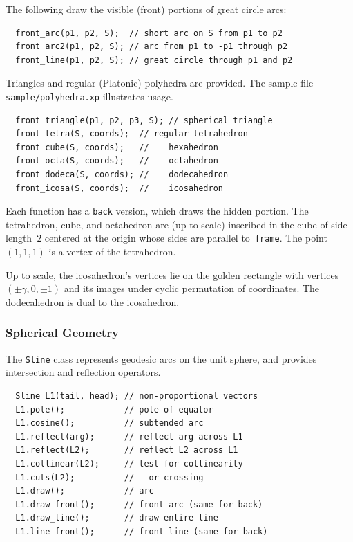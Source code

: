 \documentclass[12pt,letterpaper]{book}
\newcommand{\code}[1]{\texttt{#1}}
\newcommand{\filename}[1]{\texttt{#1}}
\newcommand{\teximath}[1]{$#1$}
\newcommand{\findex}[1]{\ignorespaces}
\begin{document}
The following draw the visible (front) portions of great circle arcs:
\findex{front\_arc}
\findex{front\_arc2}
\findex{front\_line}
\findex{back\_arc}
\findex{back\_arc2}
\findex{back\_line}
\begin{verbatim}
  front_arc(p1, p2, S);  // short arc on S from p1 to p2
  front_arc2(p1, p2, S); // arc from p1 to -p1 through p2
  front_line(p1, p2, S); // great circle through p1 and p2
\end{verbatim}
Triangles and regular (Platonic) polyhedra are provided. The sample
file \filename{sample/polyhedra.xp} illustrates usage.
\findex{front\_triangle}
\findex{front\_tetra}
\findex{front\_cube}
\findex{front\_octa}
\findex{front\_dodeca}
\findex{front\_icosa}
\findex{back\_triangle}
\findex{back\_tetra}
\findex{back\_cube}
\findex{back\_octa}
\findex{back\_dodeca}
\findex{back\_icosa}
\begin{verbatim}
  front_triangle(p1, p2, p3, S); // spherical triangle
  front_tetra(S, coords);  // regular tetrahedron
  front_cube(S, coords);   //    hexahedron
  front_octa(S, coords);   //    octahedron
  front_dodeca(S, coords); //    dodecahedron
  front_icosa(S, coords);  //    icosahedron
\end{verbatim}
Each function has a \code{back} version, which draws the hidden
portion. The tetrahedron, cube, and octahedron are (up to scale)
inscribed in the cube of side length~\teximath{2} centered at the origin whose
sides are parallel to~\code{frame}. The point \teximath{(1,1,1)} is a vertex of
the tetrahedron.

Up to scale, the icosahedron's vertices lie on the golden rectangle
with vertices \teximath{(\pm\gamma,0,\pm1)} and its images under cyclic
permutation of coordinates. The dodecahedron is dual to the
icosahedron.

\subsubsection*{Spherical Geometry}


The \code{Sline} class represents geodesic arcs on the unit sphere,
and provides intersection and reflection operators.
\findex{Sline}
\findex{pole}
\findex{cosine}
\findex{reflect}
\findex{collinear}
\findex{cuts}
\findex{draw}
\findex{draw\_front}
\findex{draw\_back}
\findex{draw\_line}
\findex{line\_front}
\findex{line\_back}
\begin{verbatim}
  Sline L1(tail, head); // non-proportional vectors
  L1.pole();            // pole of equator
  L1.cosine();          // subtended arc
  L1.reflect(arg);      // reflect arg across L1
  L1.reflect(L2);       // reflect L2 across L1
  L1.collinear(L2);     // test for collinearity
  L1.cuts(L2);          //   or crossing
  L1.draw();            // arc
  L1.draw_front();      // front arc (same for back)
  L1.draw_line();       // draw entire line
  L1.line_front();      // front line (same for back)
\end{verbatim}
\end{document}
